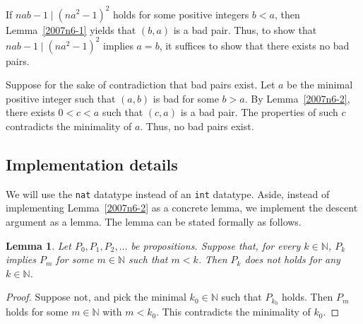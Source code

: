 \documentclass{article}
\newcommand{\N}{\mathbb{N}}
\newtheorem{lemma}{Lemma}
\begin{document}
If $nab - 1 \mid (na^2 - 1)^2$ holds for some positive integers $b < a$, then Lemma~\ref{2007n6-1} yields that $(b, a)$ is a bad pair.
Thus, to show that $nab - 1 \mid (na^2 - 1)^2$ implies $a = b$, it suffices to show that there exists no bad pairs.

Suppose for the sake of contradiction that bad pairs exist.
Let $a$ be the minimal positive integer such that $(a, b)$ is bad for some $b > a$.
By Lemma~\ref{2007n6-2}, there exists $0 < c < a$ such that $(c, a)$ is a bad pair.
The properties of such $c$ contradicts the minimality of $a$.
Thus, no bad pairs exist.



\subsection*{Implementation details}

We will use the \texttt{nat} datatype instead of an \texttt{int} datatype.
Aside, instead of implementing Lemma~\ref{2007n6-2} as a concrete lemma, we implement the descent argument as a lemma.
The lemma can be stated formally as follows.

\begin{lemma}\label{2007n6-3}
Let $P_0, P_1, P_2, \ldots$ be propositions.
Suppose that, for every $k \in \N$, $P_k$ implies $P_m$ for some $m \in \N$ such that $m < k$.
Then $P_k$ does not holds for any $k \in \N$.
\end{lemma}
\begin{proof}
Suppose not, and pick the minimal $k_0 \in \N$ such that $P_{k_0}$ holds.
Then $P_m$ holds for some $m \in \N$ with $m < k_0$.
This contradicts the minimality of $k_0$.
\end{proof}
\end{document}
